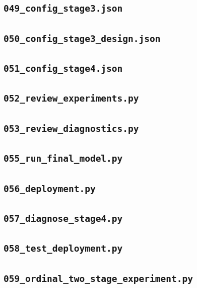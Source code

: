 \subsection*{\texttt{049\_config\_stage3.json}}

\subsection*{\texttt{050\_config\_stage3\_design.json}}

\subsection*{\texttt{051\_config\_stage4.json}}

\subsection*{\texttt{052\_review\_experiments.py}}

\subsection*{\texttt{053\_review\_diagnostics.py}}

\subsection*{\texttt{055\_run\_final\_model.py}}

\subsection*{\texttt{056\_deployment.py}}

\subsection*{\texttt{057\_diagnose\_stage4.py}}

\subsection*{\texttt{058\_test\_deployment.py}}

\subsection*{\texttt{059\_ordinal\_two\_stage\_experiment.py}}

